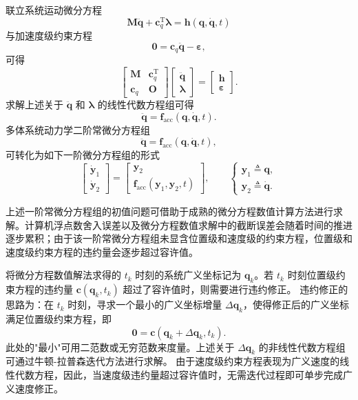 联立系统运动微分方程
\[
\boldsymbol{M}\ddot{\boldsymbol{q}} + \boldsymbol{c}_q^{\mathrm{T}}\boldsymbol{\lambda} = \boldsymbol{h}(\boldsymbol{q},\dot{\boldsymbol{q}},t)
\]
与加速度级约束方程
\[
\boldsymbol{0} = \boldsymbol{c}_q\ddot{\boldsymbol{q}} - \boldsymbol{\varepsilon},
\]
可得
\[
\begin{bmatrix}
        \boldsymbol{M} & \boldsymbol{c}_q^{\mathrm{T}}\\[3pt]
        \boldsymbol{c}_q & \boldsymbol{O}
    \end{bmatrix}
    \begin{bmatrix}
        \ddot{\boldsymbol{q}}\\[3pt]
        \boldsymbol{\lambda}
    \end{bmatrix}
    =
    \begin{bmatrix}
        \boldsymbol{h}\\[3pt]
        \boldsymbol{\varepsilon}
    \end{bmatrix}.
\]
求解上述关于 $\ddot{\boldsymbol{q}}$ 和 $\boldsymbol{\lambda}$ 的线性代数方程组可得
\[
\ddot{\boldsymbol{q}} = \boldsymbol{f}_{\text{acc}}(\boldsymbol{q},\dot{\boldsymbol{q}},t).
\]
多体系统动力学二阶常微分方程组
\[
\ddot{\boldsymbol{q}} = \boldsymbol{f}_{\text{acc}}(\boldsymbol{q},\dot{\boldsymbol{q}},t),
\]
可转化为如下一阶微分方程组的形式
\[
\begin{bmatrix}
        \dot{\boldsymbol{y}}_1\\[3pt]
        \dot{\boldsymbol{y}}_2
    \end{bmatrix}
    =
    \begin{bmatrix}
        \boldsymbol{y}_2\\[3pt]
        \boldsymbol{f}_{\text{acc}}(\boldsymbol{y}_1,\boldsymbol{y}_2,t)
    \end{bmatrix},
    \qquad
    \begin{cases}
        \boldsymbol{y}_1 \triangleq \boldsymbol{q},\\[3pt]
        \boldsymbol{y}_2 \triangleq \dot{\boldsymbol{q}}.
    \end{cases}
\]
\begin{note}
上述一阶常微分方程组的初值问题可借助于成熟的微分方程数值计算方法进行求解。计算机浮点数舍入误差以及微分方程数值求解中的截断误差会随着时间的推进逐步累积；由于该一阶常微分方程组未显含位置级和速度级的约束方程，位置级和速度级约束方程的违约量会逐步超过容许值。
\end{note}
将微分方程数值解法求得的 $t_k$ 时刻的系统广义坐标记为 $\boldsymbol{q}_k$。若 $t_k$ 时刻位置级约束方程的违约量 $\boldsymbol{c}(\boldsymbol{q}_k,t_k)$ 超过了容许值时，则需要进行违约修正。
违约修正的思路为：在 $t_k$ 时刻，寻求一个最小的广义坐标增量 $\Delta\boldsymbol{q}_k$，使得修正后的广义坐标满足位置级约束方程，即
\[
\boldsymbol{0} = \boldsymbol{c}(\boldsymbol{q}_k + \Delta\boldsymbol{q}_k,t_k).
\]
此处的"最小"可用二范数或无穷范数来度量。上述关于 $\Delta\boldsymbol{q}_k$ 的非线性代数方程组可通过牛顿-拉普森迭代方法进行求解。
由于速度级约束方程表现为广义速度的线性代数方程，因此，当速度级违约量超过容许值时，无需迭代过程即可单步完成广义速度修正。
